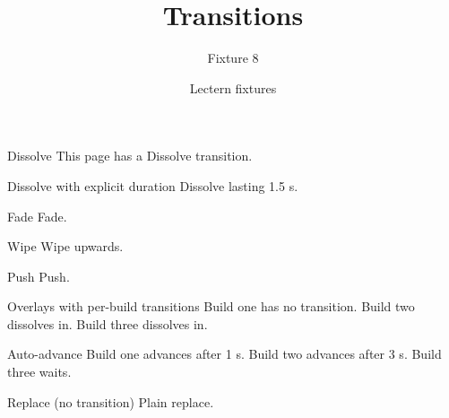 \documentclass[aspectratio=169]{beamer}
\title{Transitions}
\subtitle{Fixture 8}
\author{Lectern fixtures}
\date{}
\begin{document}
\begin{frame}
  \titlepage
\end{frame}
\begin{frame}{Dissolve}
  \transdissolve
  This page has a Dissolve transition.
\end{frame}
\begin{frame}{Dissolve with explicit duration}
  \transdissolve[duration=1.5]
  Dissolve lasting 1.5 s.
\end{frame}
\begin{frame}{Fade}
  \transfade
  Fade.
\end{frame}
\begin{frame}{Wipe}
  \transwipe[direction=90]
  Wipe upwards.
\end{frame}
\begin{frame}{Push}
  \transpush[direction=270,duration=0.5]
  Push.
\end{frame}
\begin{frame}{Overlays with per-build transitions}
  Build one has no transition.
  \pause
  Build two dissolves in.
  \pause
  Build three dissolves in.
\end{frame}
\begin{frame}{Auto-advance}
  Build one advances after 1 s.
  \pause
  Build two advances after 3 s.
  \pause
  Build three waits.
\end{frame}
\begin{frame}{Replace (no transition)}
  \transreplace
  Plain replace.
\end{frame}
\end{document}

